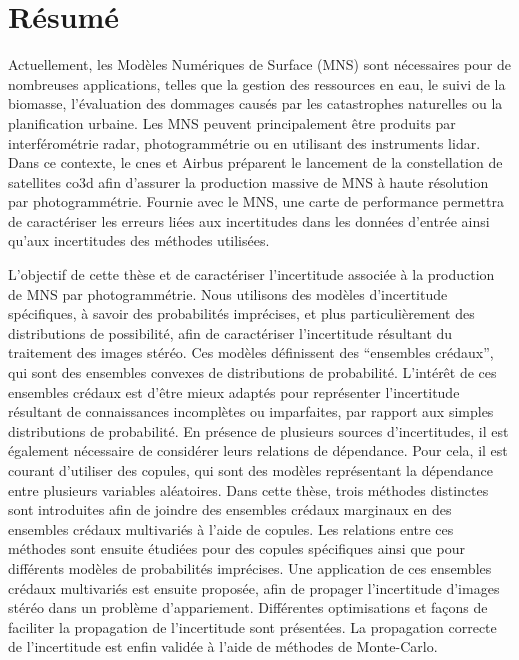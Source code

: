 \chapter*{Résumé}
Actuellement, les Modèles Numériques de Surface (MNS) sont nécessaires pour de nombreuses applications, telles que la gestion des ressources en eau, le suivi de la biomasse, l'évaluation des dommages causés par les catastrophes naturelles ou la planification urbaine. Les MNS peuvent principalement être produits par interférométrie \acrshort{radar}, photogrammétrie ou en utilisant des instruments \acrshort{lidar}. Dans ce contexte, le \acrshort{cnes} et Airbus préparent le lancement de la constellation de satellites \acrshort{co3d} afin d'assurer la production massive de MNS à haute résolution par photogrammétrie. Fournie avec le MNS, une carte de performance permettra de caractériser les erreurs liées aux incertitudes dans les données d'entrée ainsi qu'aux incertitudes des méthodes utilisées.

L'objectif de cette thèse et de caractériser l'incertitude associée à la production de MNS par photogrammétrie. Nous utilisons des modèles d'incertitude spécifiques, à savoir des probabilités imprécises, et plus particulièrement des distributions de possibilité, afin de caractériser l'incertitude résultant du traitement des images stéréo. Ces modèles définissent des ``ensembles crédaux'', qui sont des ensembles convexes de distributions de probabilité. L'intérêt de ces ensembles crédaux est d'être mieux adaptés pour représenter l'incertitude résultant de connaissances incomplètes ou imparfaites, par rapport aux simples distributions de probabilité. En présence de plusieurs sources d'incertitudes, il est également nécessaire de considérer leurs relations de dépendance. Pour cela, il est courant d'utiliser des copules, qui sont des modèles représentant la dépendance entre plusieurs variables aléatoires. Dans cette thèse, trois méthodes distinctes sont introduites afin de joindre des ensembles crédaux marginaux en des ensembles crédaux multivariés à l'aide de copules. Les relations entre ces méthodes sont ensuite étudiées pour des copules spécifiques ainsi que pour différents modèles de probabilités imprécises. Une application de ces ensembles crédaux multivariés est ensuite proposée, afin de propager l'incertitude d'images stéréo dans un problème d'appariement. Différentes optimisations et façons de faciliter la propagation de l'incertitude sont présentées. La propagation correcte de l'incertitude est enfin validée à l'aide de méthodes de Monte-Carlo.

